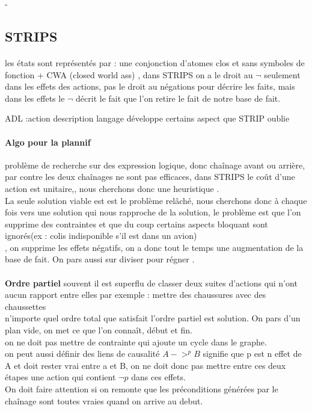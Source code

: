 \documentclass{article}
\begin{document}
-\subsection{STRIPS} 
\paragraph{}
les états sont représentés par : une conjonction d'atomes clos et sans symboles de fonction + CWA (closed world ass) , dans STRIPS on a le droit au $\neg$ seulement dans les effets des actions, pas le droit au négations pour décrire les faits, mais dans les effets le $\neg$ décrit le fait que l'on retire le fait de notre base de fait.

ADL :action description langage développe certains aspect que STRIP oublie

\paragraph{Algo pour la plannif} problème de recherche sur des expression logique, donc chaînage avant ou arrière, 
\\
par contre les deux chaînages ne sont pas efficaces, dans STRIPS le coût d'une action est unitaire,, nous cherchons donc une heuristique .\\
La seule solution viable est est le problème relâché, nous cherchons donc à chaque fois vers une solution qui nous rapproche de la solution, le problème est que l'on supprime des contraintes et que du coup certains aspects bloquant sont ignorés(ex : colis indisponible s'il est dans un avion)\\, on supprime les effets négatifs, on a donc tout le temps une augmentation de la base de fait.
On pars aussi sur diviser pour régner .\\\\
\textbf{Ordre partiel} souvent il est superflu de classer deux suites d'actions qui n'ont aucun rapport entre elles
par exemple  : mettre des chaussures avec des chaussettes\\n'importe quel ordre total que satisfait l'ordre partiel est solution. On pars d'un plan vide, on met ce que l'on connaît, début et fin.\\
on ne doit pas mettre de contrainte qui ajoute un cycle dans le graphe. \\on peut aussi définir des liens de causalité $A ->^p B$  signifie que p est n effet de A et doit rester vrai entre a et B, on ne doit donc pas mettre entre ces deux étapes une action qui contient $\neg p$ dans ces effets.\\ On doit faire attention si on remonte que les préconditions générées par le chaînage sont toutes vraies quand on arrive au debut.
\end{document}
